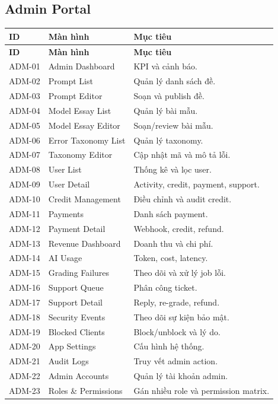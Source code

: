 \documentclass[11pt,a4paper]{article}
\begin{document}
\subsection{Admin Portal}
\begin{longtable}{|P{0.14\textwidth}|P{0.31\textwidth}|P{0.45\textwidth}|}
\hline
\textbf{ID} & \textbf{Màn hình} & \textbf{Mục tiêu} \\ \hline
\endfirsthead
\hline
\textbf{ID} & \textbf{Màn hình} & \textbf{Mục tiêu} \\ \hline
\endhead
ADM-01 & Admin Dashboard & KPI và cảnh báo. \\ \hline
ADM-02 & Prompt List & Quản lý danh sách đề. \\ \hline
ADM-03 & Prompt Editor & Soạn và publish đề. \\ \hline
ADM-04 & Model Essay List & Quản lý bài mẫu. \\ \hline
ADM-05 & Model Essay Editor & Soạn/review bài mẫu. \\ \hline
ADM-06 & Error Taxonomy List & Quản lý taxonomy. \\ \hline
ADM-07 & Taxonomy Editor & Cập nhật mã và mô tả lỗi. \\ \hline
ADM-08 & User List & Thống kê và lọc user. \\ \hline
ADM-09 & User Detail & Activity, credit, payment, support. \\ \hline
ADM-10 & Credit Management & Điều chỉnh và audit credit. \\ \hline
ADM-11 & Payments & Danh sách payment. \\ \hline
ADM-12 & Payment Detail & Webhook, credit, refund. \\ \hline
ADM-13 & Revenue Dashboard & Doanh thu và chi phí. \\ \hline
ADM-14 & AI Usage & Token, cost, latency. \\ \hline
ADM-15 & Grading Failures & Theo dõi và xử lý job lỗi. \\ \hline
ADM-16 & Support Queue & Phân công ticket. \\ \hline
ADM-17 & Support Detail & Reply, re-grade, refund. \\ \hline
ADM-18 & Security Events & Theo dõi sự kiện bảo mật. \\ \hline
ADM-19 & Blocked Clients & Block/unblock và lý do. \\ \hline
ADM-20 & App Settings & Cấu hình hệ thống. \\ \hline
ADM-21 & Audit Logs & Truy vết admin action. \\ \hline
ADM-22 & Admin Accounts & Quản lý tài khoản admin. \\ \hline
ADM-23 & Roles \& Permissions & Gán nhiều role và permission matrix. \\ \hline
\end{longtable}
\normalsize
\end{document}
